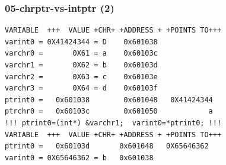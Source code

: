 \documentclass[aspectratio=169, xcolor=table, notheorems, hyperref={pdfpagelabels=false}]{beamer}
\begin{document}
\begin{frame}[fragile]
\frametitle{05-chrptr-vs-intptr (2)}
\begin{lstlisting}[basicstyle=\ttfamily\footnotesize]
VARIABLE  +++  VALUE +CHR+ +ADDRESS + +POINTS TO+++
varint0 = 0X41424344 = D    0x601038
varchr0 =       0X61 = a    0x60103c
varchr1 =       0X62 = b    0x60103d
varchr2 =       0X63 = c    0x60103e
varchr3 =       0X64 = d    0x60103f
ptrint0 =   0x601038        0x601048   0X41424344
ptrchr0 =   0x60103c        0x601050            a
!!! ptrint0=(int*) &varchr1;  varint0=*ptrint0; !!!
VARIABLE  +++  VALUE +CHR+ +ADDRESS + +POINTS TO+++
ptrint0 =   0x60103d       0x601048   0X65646362
varint0 = 0X65646362 = b   0x601038
\end{lstlisting}

\begin{minipage}[t]{120mm}
\end{minipage}

\end{frame}
\end{document}
